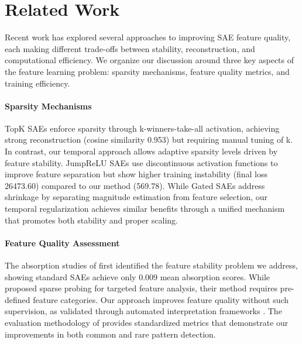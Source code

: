 \documentclass{article} %
\begin{document}
\section{Related Work}
\label{sec:related}

Recent work has explored several approaches to improving SAE feature quality, each making different trade-offs between stability, reconstruction, and computational efficiency. We organize our discussion around three key aspects of the feature learning problem: sparsity mechanisms, feature quality metrics, and training efficiency.

\paragraph{Sparsity Mechanisms} TopK SAEs \cite{bussmannBatchTopKSparseAutoencoders2024} enforce sparsity through k-winners-take-all activation, achieving strong reconstruction (cosine similarity 0.953) but requiring manual tuning of k. In contrast, our temporal approach allows adaptive sparsity levels driven by feature stability. JumpReLU SAEs \cite{rajamanoharanJumpingAheadImproving2024} use discontinuous activation functions to improve feature separation but show higher training instability (final loss 26473.60) compared to our method (569.78). While Gated SAEs \cite{rajamanoharanImprovingDictionaryLearning2024} address shrinkage by separating magnitude estimation from feature selection, our temporal regularization achieves similar benefits through a unified mechanism that promotes both stability and proper scaling.

\paragraph{Feature Quality Assessment} The absorption studies of \cite{chaninAbsorptionStudyingFeature2024} first identified the feature stability problem we address, showing standard SAEs achieve only 0.009 mean absorption scores. While \cite{gurneeFindingNeuronsHaystack2023} proposed sparse probing for targeted feature analysis, their method requires pre-defined feature categories. Our approach improves feature quality without such supervision, as validated through automated interpretation frameworks \cite{pauloAutomaticallyInterpretingMillions2024}. The evaluation methodology of \cite{karvonenEvaluatingSparseAutoencoders2024} provides standardized metrics that demonstrate our improvements in both common and rare pattern detection.
\end{document}

